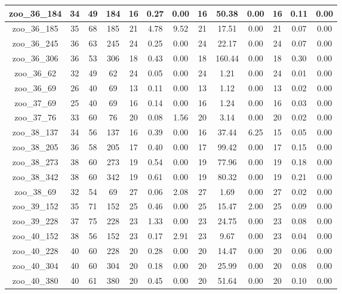 \begin{landscape}
\begin{longtable}{|c|c|c|c|c|c|c|c|c|c|c|c|c|}
zoo\_36\_184 & 34 & 49 & 184 & 16 & 0.27 & 0.00 & 16 & 50.38 & 0.00 & 16 & 0.11 & 0.00 \\ \hline 
zoo\_36\_185 & 35 & 68 & 185 & 21 & 4.78 & 9.52 & 21 & 17.51 & 0.00 & 21 & 0.07 & 0.00 \\ \hline 
zoo\_36\_245 & 36 & 63 & 245 & 24 & 0.25 & 0.00 & 24 & 22.17 & 0.00 & 24 & 0.07 & 0.00 \\ \hline 
zoo\_36\_306 & 36 & 53 & 306 & 18 & 0.43 & 0.00 & 18 & 160.44 & 0.00 & 18 & 0.30 & 0.00 \\ \hline 
zoo\_36\_62 & 32 & 49 & 62 & 24 & 0.05 & 0.00 & 24 & 1.21 & 0.00 & 24 & 0.01 & 0.00 \\ \hline 
zoo\_36\_69 & 26 & 40 & 69 & 13 & 0.11 & 0.00 & 13 & 1.12 & 0.00 & 13 & 0.02 & 0.00 \\ \hline 
zoo\_37\_69 & 25 & 40 & 69 & 16 & 0.14 & 0.00 & 16 & 1.24 & 0.00 & 16 & 0.03 & 0.00 \\ \hline 
zoo\_37\_76 & 33 & 60 & 76 & 20 & 0.08 & 1.56 & 20 & 3.14 & 0.00 & 20 & 0.02 & 0.00 \\ \hline 
zoo\_38\_137 & 34 & 56 & 137 & 16 & 0.39 & 0.00 & 16 & 37.44 & 6.25 & 15 & 0.05 & 0.00 \\ \hline 
zoo\_38\_205 & 36 & 58 & 205 & 17 & 0.40 & 0.00 & 17 & 99.42 & 0.00 & 17 & 0.15 & 0.00 \\ \hline 
zoo\_38\_273 & 38 & 60 & 273 & 19 & 0.54 & 0.00 & 19 & 77.96 & 0.00 & 19 & 0.18 & 0.00 \\ \hline 
zoo\_38\_342 & 38 & 60 & 342 & 19 & 0.61 & 0.00 & 19 & 80.32 & 0.00 & 19 & 0.21 & 0.00 \\ \hline 
zoo\_38\_69 & 32 & 54 & 69 & 27 & 0.06 & 2.08 & 27 & 1.69 & 0.00 & 27 & 0.02 & 0.00 \\ \hline 
zoo\_39\_152 & 35 & 71 & 152 & 25 & 0.46 & 0.00 & 25 & 15.47 & 2.00 & 25 & 0.09 & 0.00 \\ \hline 
zoo\_39\_228 & 37 & 75 & 228 & 23 & 1.33 & 0.00 & 23 & 24.75 & 0.00 & 23 & 0.08 & 0.00 \\ \hline 
zoo\_40\_152 & 38 & 56 & 152 & 23 & 0.17 & 2.91 & 23 & 9.67 & 0.00 & 23 & 0.04 & 0.00 \\ \hline 
zoo\_40\_228 & 40 & 60 & 228 & 20 & 0.28 & 0.00 & 20 & 14.47 & 0.00 & 20 & 0.06 & 0.00 \\ \hline 
zoo\_40\_304 & 40 & 60 & 304 & 20 & 0.18 & 0.00 & 20 & 25.99 & 0.00 & 20 & 0.08 & 0.00 \\ \hline 
zoo\_40\_380 & 40 & 61 & 380 & 20 & 0.45 & 0.00 & 20 & 51.64 & 0.00 & 20 & 0.10 & 0.00 \\ \hline 

\end{longtable}
\end{landscape}
